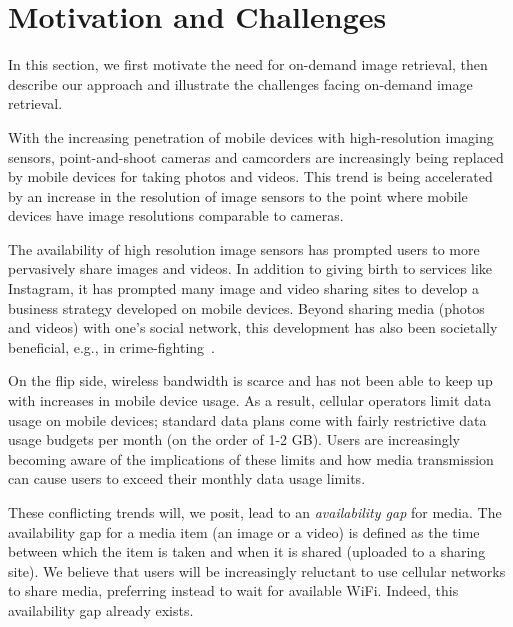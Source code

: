 \section{Motivation and Challenges}
\label{sec-2}

In this section, we first motivate the need for on-demand image
retrieval, then describe our approach and illustrate the challenges
facing on-demand image retrieval.

With the increasing penetration of mobile devices with high-resolution
imaging sensors, point-and-shoot cameras and camcorders are
increasingly being replaced by mobile devices for taking photos and
videos.
%
This trend is being accelerated by an increase in the resolution of
image sensors to the point where mobile devices have image resolutions
comparable to cameras.
%

The availability of high resolution image sensors has prompted
users to more pervasively share images and videos.
%
In addition to giving birth to services like Instagram, it has
prompted many image and video sharing sites to develop a business
strategy developed on mobile devices.
%
Beyond sharing media (photos and videos) with one's social network,
this development has also been societally beneficial, e.g., in
crime-fighting~\cite{cops}.

On the flip side,
wireless bandwidth is scarce and has not been able to
keep up with increases in mobile device usage.
%
As a result, cellular operators limit data usage on mobile devices;
standard data plans come with fairly restrictive data usage budgets
per month (on the order of 1-2 GB).
%
Users are increasingly becoming aware of the implications of these
limits and how media transmission can cause users to exceed
their monthly data usage limits.

These conflicting trends will, we posit, lead to an \emph{availability
gap} for media.
%
The availability gap for a media item (an image or a video) is defined
as the time between which the item is taken and when it is shared
(uploaded to a sharing site).
%
We believe that users will be increasingly reluctant to use cellular
networks to share media, preferring instead to wait for available
WiFi.
%
Indeed, this availability gap already exists.
%
%

